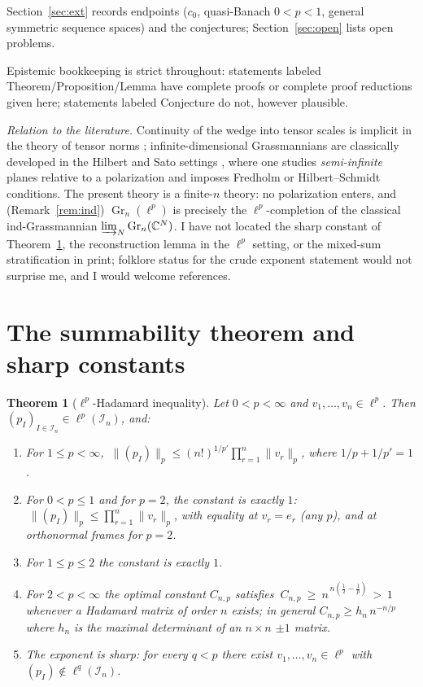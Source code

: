 \documentclass[11pt]{amsart}
\newtheorem{theorem}{Theorem}[section]
\theoremstyle{definition}
\newcommand{\C}{\mathbb{C}}
\newcommand{\Gr}{\operatorname{Gr}}
\begin{document}
Section~\ref{sec:ext} records endpoints ($c_0$, quasi-Banach $0<p<1$, general symmetric sequence spaces) and the conjectures; Section~\ref{sec:open} lists open problems.

Epistemic bookkeeping is strict throughout: statements labeled Theorem/Proposition/Lemma have complete proofs or complete proof reductions given here; statements labeled Conjecture do not, however plausible.

\emph{Relation to the literature.} Continuity of the wedge into tensor scales is implicit in the theory of tensor norms \cite{Ryan,DF}; infinite-dimensional Grassmannians are classically developed in the Hilbert and Sato settings \cite{PS,SW}, where one studies \emph{semi-infinite} planes relative to a polarization and imposes Fredholm or Hilbert--Schmidt conditions. The present theory is a finite-$n$ theory: no polarization enters, and (Remark~\ref{rem:ind}) $\Gr_n(\ell^p)$ is precisely the $\ell^p$-completion of the classical ind-Grassmannian $\varinjlim_N \Gr_n(\C^N)$. I have not located the sharp constant of Theorem~\ref{thm:main-norm}, the reconstruction lemma in the $\ell^p$ setting, or the mixed-sum stratification in print; folklore status for the crude exponent statement would not surprise me, and I would welcome references.

\section{The summability theorem and sharp constants}\label{sec:norm}

\begin{theorem}[$\ell^p$-Hadamard inequality]\label{thm:main-norm}
Let $0<p<\infty$ and $v_1,\dots,v_n\in\ell^p$. Then $(p_I)_{I\in\mathcal I_n}\in\ell^p(\mathcal I_n)$, and:
\begin{enumerate}[label=\textup{(\alph*)}]
\item\label{it:crude} For $1\le p<\infty$,
$\ \big\|(p_I)\big\|_{p}\le (n!)^{1/p'}\prod_{r=1}^n\|v_r\|_p$, where $1/p+1/p'=1$.
\item\label{it:one} For $0<p\le 1$ and for $p=2$, the constant is exactly $1$:
$\ \big\|(p_I)\big\|_{p}\le \prod_{r=1}^n\|v_r\|_p$, with equality at $v_r=e_r$ (any $p$), and at orthonormal frames for $p=2$.
\item\label{it:interp} For $1\le p\le 2$ the constant is exactly $1$.
\item\label{it:sup} For $2<p<\infty$ the optimal constant $C_{n,p}$ satisfies
$\ C_{n,p}\ \ge\ n^{\,n\left(\frac12-\frac1p\right)} \,>\,1$
whenever a Hadamard matrix of order $n$ exists; in general $C_{n,p}\ge h_n\, n^{-n/p}$ where $h_n$ is the maximal determinant of an $n\times n$ $\pm1$ matrix.
\item\label{it:sharp-exp} The exponent is sharp: for every $q<p$ there exist $v_1,\dots,v_n\in\ell^p$ with $(p_I)\notin\ell^q(\mathcal I_n)$.
\end{enumerate}
\end{theorem}
\end{document}
